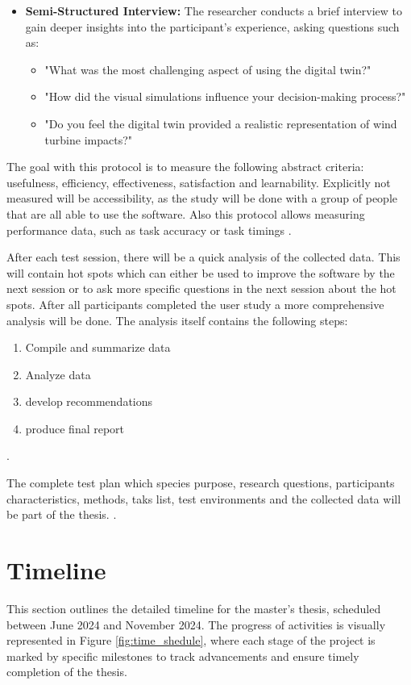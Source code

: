 \documentclass[11pt, titlepage, a4paper]{scrartcl}
\begin{document}
\begin{linenumbers}
\begin{itemize}
        \item \textbf{Semi-Structured Interview:} The researcher conducts a brief interview to gain deeper insights into the participant's experience, asking questions such as:
              \begin{itemize}
                  \item "What was the most challenging aspect of using the digital twin?"
                  \item "How did the visual simulations influence your decision-making process?"
                  \item "Do you feel the digital twin provided a realistic representation of wind turbine impacts?"
              \end{itemize}
    \end{itemize}
    The goal with this protocol is to measure the following abstract criteria: usefulness, efficiency, effectiveness, satisfaction and learnability. Explicitly not measured will be accessibility, as the study will be done with a group of people that are all able to use the software. Also this protocol allows measuring performance data, such as task accuracy or task timings \cite{rubinHandbookUsabilityTesting2008}.

    After each test session, there will be a quick analysis of the collected data. This will contain hot spots which can either be used to improve the software by the next session or to ask more specific questions in the next session about the hot spots.
    After all participants completed the user study a more comprehensive analysis will be done. 
    The analysis itself contains the following steps:
    \begin{enumerate}
        \item Compile and summarize data
        \item Analyze data
        \item develop recommendations
        \item produce final report
    \end{enumerate}
    \cite{rubinHandbookUsabilityTesting2008}.

    The complete test plan which species purpose, research questions, participants characteristics, methods, taks list, test environments and the collected data will be part of the thesis. \cite{rubinHandbookUsabilityTesting2008}.


    \section{Timeline}
    This section outlines the detailed timeline for the master's thesis, scheduled between June 2024 and November 2024.
    The progress of activities is visually represented in Figure \ref{fig:time_shedule}, where each stage of the project is marked by specific milestones to track advancements and ensure timely completion of the thesis.



\end{linenumbers}
\end{document}
